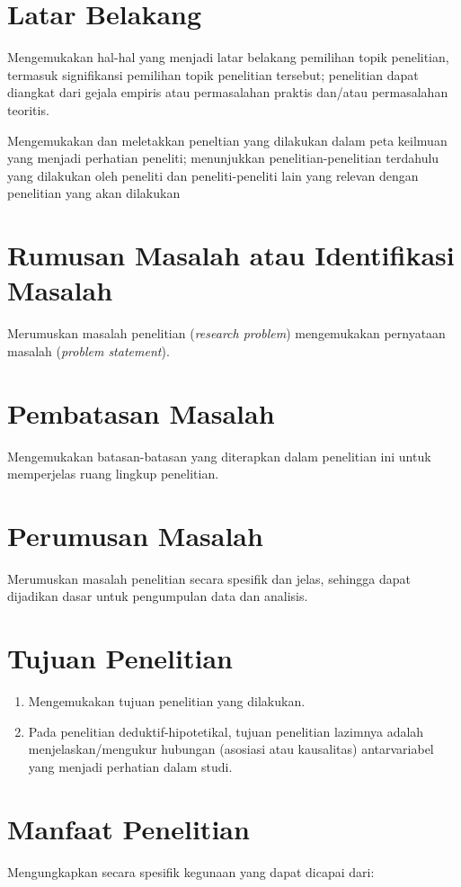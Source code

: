 \section{Latar Belakang} 
Mengemukakan hal-hal yang menjadi latar belakang pemilihan topik penelitian, termasuk signifikansi pemilihan topik penelitian tersebut; penelitian dapat diangkat dari gejala empiris atau permasalahan praktis dan/atau permasalahan teoritis. 

Mengemukakan dan meletakkan peneltian yang dilakukan dalam peta keilmuan yang menjadi perhatian peneliti; menunjukkan penelitian-penelitian terdahulu yang dilakukan oleh peneliti dan peneliti-peneliti lain yang relevan dengan penelitian yang akan dilakukan

\section{Rumusan Masalah atau Identifikasi Masalah}
Merumuskan masalah penelitian (\textit{research problem}) mengemukakan pernyataan masalah (\textit{problem statement}).

\section{Pembatasan Masalah}
Mengemukakan batasan-batasan yang diterapkan dalam penelitian ini untuk memperjelas ruang lingkup penelitian.

\section{Perumusan Masalah}
Merumuskan masalah penelitian secara spesifik dan jelas, sehingga dapat dijadikan dasar untuk pengumpulan data dan analisis.

\section{Tujuan Penelitian}
\begin{enumerate}
\item Mengemukakan tujuan penelitian yang dilakukan. 

\item Pada penelitian deduktif-hipotetikal, tujuan penelitian lazimnya adalah menjelaskan/mengukur hubungan (asosiasi atau kausalitas) antarvariabel yang menjadi perhatian dalam studi. 
\end{enumerate}

\section{Manfaat Penelitian} 
Mengungkapkan secara spesifik kegunaan yang dapat dicapai dari: 

